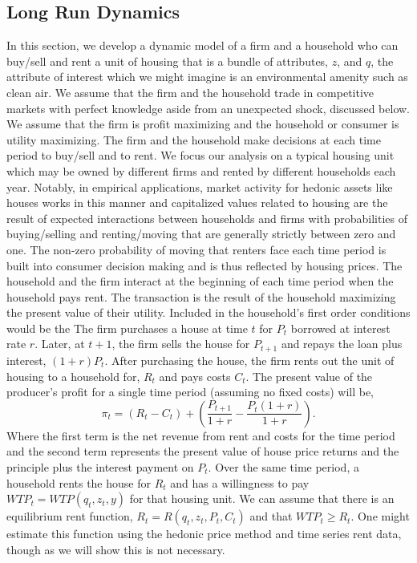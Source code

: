 \documentclass[ecta,nameyear,draft]{econsocart}
\theoremstyle{plain}
\theoremstyle{remark}
\begin{document}
\subsection{Long Run Dynamics}
In this section, we develop a dynamic model of a firm and a household who can buy/sell and rent a unit of housing that is a bundle of attributes, $z$, and $q$, the attribute of interest which we might imagine is an environmental amenity such as clean air. We assume that the firm and the household trade in competitive markets with perfect knowledge aside from an unexpected shock, discussed below.
We assume that the firm is profit maximizing and the household or consumer is utility maximizing. The firm and the household make decisions at each time period to buy/sell and to rent. We focus our analysis on a typical housing unit which may be owned by different firms and rented by different households each year. Notably, in empirical applications, market activity for hedonic assets like houses works in this manner and capitalized values related to housing are the result of expected interactions between households and firms with probabilities of buying/selling and renting/moving that are generally strictly between zero and one. The non-zero probability of moving that renters face each time period is built into consumer decision making and is thus reflected by housing prices.
The household and the firm interact at the beginning of each time period when the household pays rent. The transaction is the result of the household maximizing the present value of their utility. Included in the household's first order conditions would be the  
The firm purchases a house at time $t$ for $P_t$ borrowed at interest rate $r$. Later, at $t+1$, the firm sells the house for $P_{t+1}$ and repays the loan plus interest, $(1 + r)P_t$. After purchasing the house, the firm rents
out the unit of housing to a household for, $R_t$ and pays costs $C_t$. The present value of the producer’s profit for a single time period (assuming no fixed costs) will be,
\begin{equation}
	\pi_t = (R_t-C_t)+\left(\frac{P_{t+1}}{1+r}-\frac{P_t(1+r)}{1+r}\right).\label{pi1}
\end{equation}
Where the first term is the net revenue from rent and costs for the time period and the second term
represents the present value of house price returns and the principle plus the interest payment on $P_t$.
Over the same time period, a household rents the house for $R_t$ and has a willingness to pay $\mathit{WTP}_t=\mathit{WTP}(q_t,z_t,y)$ for that housing unit. We can assume that there is an equilibrium rent function, $R_t=R(q_t,z_t,P_t,C_t)$ and that $\mathit{WTP}_t \geq R_t$. One might estimate this function using the hedonic price method and time series rent data, though as we will show this is not necessary. 
\end{document}
